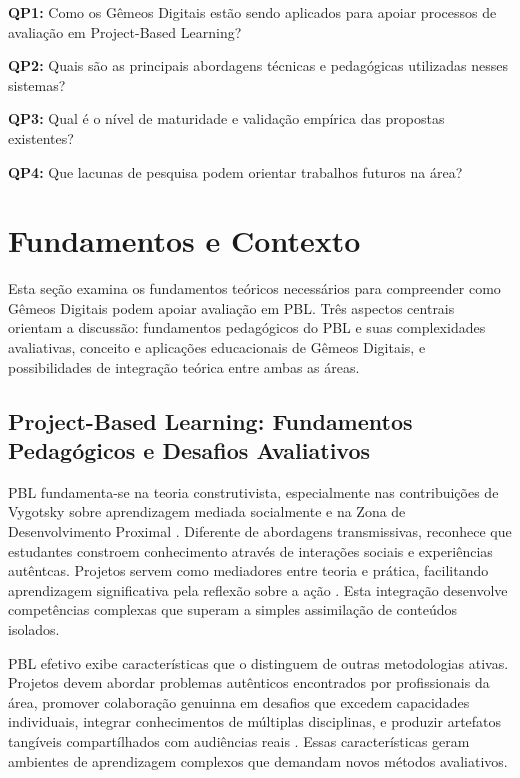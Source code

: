 \documentclass[english, spanish, brazilian]{RBIEarticle} %
\begin{document}
\textbf{QP1:} Como os Gêmeos Digitais estão sendo aplicados para apoiar processos de avaliação em Project-Based Learning?

\textbf{QP2:} Quais são as principais abordagens técnicas e pedagógicas utilizadas nesses sistemas?

\textbf{QP3:} Qual é o nível de maturidade e validação empírica das propostas existentes?

\textbf{QP4:} Que lacunas de pesquisa podem orientar trabalhos futuros na área?

\section{Fundamentos e Contexto}

Esta seção examina os fundamentos teóricos necessários para compreender como Gêmeos Digitais podem apoiar avaliação em PBL. Três aspectos centrais orientam a discussão: fundamentos pedagógicos do PBL e suas complexidades avaliativas, conceito e aplicações educacionais de Gêmeos Digitais, e possibilidades de integração teórica entre ambas as áreas.

\subsection{Project-Based Learning: Fundamentos Pedagógicos e Desafios Avaliativos}

PBL fundamenta-se na teoria construtivista, especialmente nas contribuições de Vygotsky sobre aprendizagem mediada socialmente e na Zona de Desenvolvimento Proximal \parencite{Vygotsky1978}. Diferente de abordagens transmissivas, reconhece que estudantes constroem conhecimento através de interações sociais e experiências autêntcas. Projetos servem como mediadores entre teoria e prática, facilitando aprendizagem significativa pela reflexão sobre a ação \parencite{Dewey1938}. Esta integração desenvolve competências complexas que superam a simples assimilação de conteúdos isolados.

PBL efetivo exibe características que o distinguem de outras metodologias ativas. Projetos devem abordar problemas autênticos encontrados por profissionais da área, promover colaboração genuinna em desafios que excedem capacidades individuais, integrar conhecimentos de múltiplas disciplinas, e produzir artefatos tangíveis compartílhados com audiências reais \parencite{Thomas2000}. Essas características geram ambientes de aprendizagem complexos que demandam novos métodos avaliativos.
\end{document}
